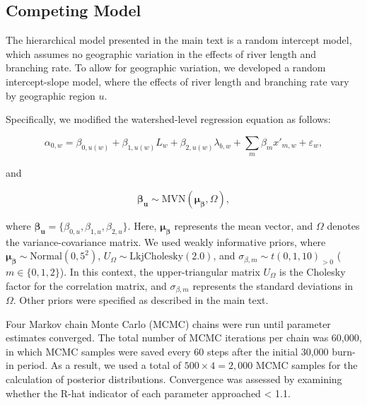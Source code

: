\documentclass[11pt, class=article, crop=false]{standalone}
\begin{document}
\subsection{Competing Model}

The hierarchical model presented in the main text is a random intercept model, which assumes no geographic variation in the effects of river length and branching rate. To allow for geographic variation, we developed a random intercept-slope model, where the effects of river length and branching rate vary by geographic region $u$.

Specifically, we modified the watershed-level regression equation as follows:

\begin{equation}
    \alpha_{0, w} = \beta_{0, u(w)} + \beta_{1, u(w)} L_w + \beta_{2, u(w)} \lambda_{b, w} + \sum_m \beta_m x'_{m, w} + \varepsilon_{w},
    \label{eq:watershed-average}
\end{equation}

and

\begin{equation}
    \boldsymbol{\beta_u} \sim \mbox{MVN}(\boldsymbol{\mu_{\beta}}, \Omega),
\end{equation}

where $\boldsymbol{\beta_u} = \{\beta_{0, u}, \beta_{1, u}, \beta_{2, u}\}$. Here, $\boldsymbol{\mu_{\beta}}$ represents the mean vector, and $\Omega$ denotes the variance-covariance matrix.
We used weakly informative priors, where $\boldsymbol{\mu_{\beta}} \sim \mbox{Normal}(0, 5^2)$, $U_{\Omega} \sim \mbox{LkjCholesky}(2.0)$, and $\sigma_{\beta, m} \sim t(0, 1, 10)_{>0}$ ($m \in \{0, 1, 2\}$). In this context, the upper-triangular matrix $U_{\Omega}$ is the Cholesky factor for the correlation matrix, and $\sigma_{\beta, m}$ represents the standard deviations in $\Omega$.
Other priors were specified as described in the main text.

Four Markov chain Monte Carlo (MCMC) chains were run until parameter estimates
converged.
The total number of MCMC iterations per chain was 60,000, in which MCMC samples were saved every 60 steps after the initial 30,000 burn-in period.
As a result, we used a total of $500 \times 4 = 2,000$ MCMC samples for the calculation of posterior distributions.
Convergence was assessed by examining whether the R-hat indicator of each parameter approached < 1.1.


\end{document}
